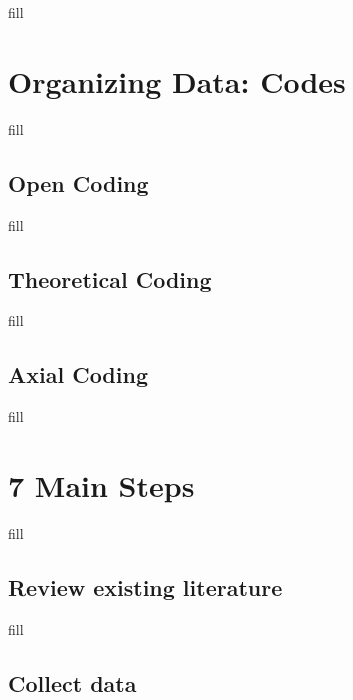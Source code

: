 \documentclass[
  b5paper]{book}
\begin{document}
fill

\hypertarget{organizing-data-codes}{%
\section{Organizing Data: Codes}\label{organizing-data-codes}}

fill

\hypertarget{open-coding}{%
\subsection*{Open Coding}\label{open-coding}}

fill

\hypertarget{theoretical-coding}{%
\subsection*{Theoretical Coding}\label{theoretical-coding}}

fill

\hypertarget{axial-coding}{%
\subsection*{Axial Coding}\label{axial-coding}}

fill

\hypertarget{main-steps}{%
\section{7 Main Steps}\label{main-steps}}

fill

\hypertarget{review-existing-literature}{%
\subsection*{Review existing literature}\label{review-existing-literature}}

fill

\hypertarget{collect-data}{%
\subsection*{Collect data}\label{collect-data}}
\end{document}
